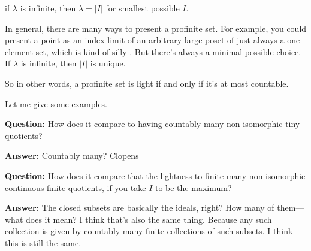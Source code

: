 \begin{remark}
if $\lambda$ is infinite, then $\lambda = |I|$ for smallest possible $I$.

In general, there are many ways to present a profinite set. For example, you could present a point as an index limit of an arbitrary large poset of just always a one-element set, which is kind of silly . But there's always a minimal possible choice. If $\lambda$ is infinite, then $|I|$ is unique.

So in other words, a profinite set is light if and only if it's at most countable.

\end{remark}

Let me give some examples.

\textbf{Question:} How does it compare to having countably many non-isomorphic tiny quotients? 

\textbf{Answer:} Countably many? Clopens

\textbf{Question:} How does it compare that the lightness to  finite many non-isomorphic continuous finite quotients, if you take $I$ to be the maximum? 

\textbf{Answer:} The closed subsets are basically the ideals, right? How many of them---what does it mean? I think that's also the same thing. Because any such collection is given by countably many finite collections of such subsets. I think this is still the same.


